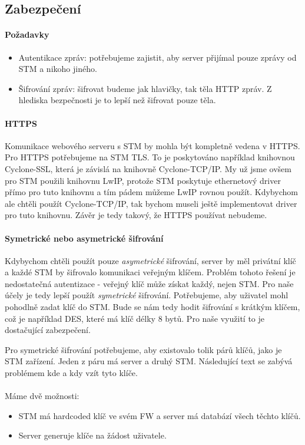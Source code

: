 
\subsection{Zabezpečení}

\paragraph{Požadavky}
\begin{itemize}
    \item Autentikace zpráv: potřebujeme zajistit, aby server přijímal pouze zprávy od STM a nikoho jiného.
    \item Šifrování zpráv: šifrovat budeme jak hlavičky, tak těla HTTP zpráv. Z hlediska bezpečnosti
        je to lepší než šifrovat pouze těla.
\end{itemize}


\paragraph{HTTPS}
Komunikace webového serveru s STM by mohla být kompletně vedena v HTTPS.
Pro HTTPS potřebujeme na STM TLS.
To je poskytováno například knihovnou Cyclone-SSL, která je závislá na knihovně Cyclone-TCP/IP.
My už jsme ovšem pro STM použili knihovnu LwIP, protože STM poskytuje ethernetový driver přímo
pro tuto knihovnu a tím pádem můžeme LwIP rovnou použít.
Kdybychom ale chtěli použít Cyclone-TCP/IP, tak bychom museli ještě implementovat driver pro
tuto knihovnu.
Závěr je tedy takový, že HTTPS používat nebudeme.

\paragraph{Symetrické nebo asymetrické šifrování}
Kdybychom chtěli použít pouze \emph{asymetrické} šifrování, server by měl privátní klíč a každé STM
by šifrovalo komunikaci veřejným klíčem.
Problém tohoto řešení je nedostatečná autentizace - veřejný klíč může získat každý, nejen STM.
Pro naše účely je tedy lepší použít \emph{symetrické} šifrování.
Potřebujeme, aby uživatel mohl pohodlně zadat klíč do STM.
Bude se nám tedy hodit šifrování s krátkým klíčem, což je například DES, které má
klíč délky 8 bytů.
Pro naše využití to je dostačující zabezpečení.


Pro symetrické šifrování potřebujeme, aby existovalo tolik párů klíčů, jako je STM zařízení.
Jeden z páru má server a druhý STM.
Následující text se zabývá problémem kde a kdy vzít tyto klíče.
\\ \\ 
Máme dvě možnosti:
\begin{itemize}
    \item STM má hardcoded klíč ve svém FW a server má databází všech těchto klíčů.
    \item Server generuje klíče na žádost uživatele.
\end{itemize}

